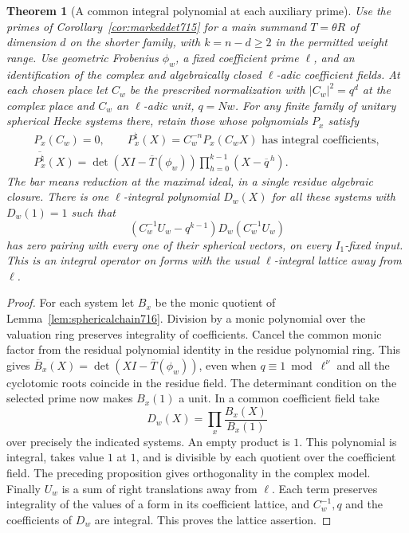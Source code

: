 \documentclass[a4paper,11pt]{article}
\newtheorem{theorem}[proposition]{Theorem}
\theoremstyle{definition}
\theoremstyle{remark}
\numberwithin{equation}{section}
\begin{document}
\begin{theorem}[A common integral polynomial at each auxiliary prime]
\leavevmode\label{thm:commonhecke716}
Use the primes of Corollary~\ref{cor:markeddet715} for a main
summand \(T=\theta R\) of dimension \(d\) on the shorter
family, with \(k=n-d\ge2\) in the permitted weight range.
Use geometric Frobenius \(\phi_w\), a fixed coefficient prime
\(\ell\), and an identification of the complex and algebraically
closed \(\ell\)-adic coefficient fields. At each chosen place
let \(C_w\) be the prescribed normalization with
\(|C_w|^2=q^d\) at the complex place and \(C_w\) an
\(\ell\)-adic unit, \(q=Nw\). For any finite family of unitary spherical Hecke systems
there, retain those whose polynomials \(P_x\) satisfy
\[
 \begin{gathered}
 P_x(C_w)=0,\qquad P_x^\natural(X)=C_w^{-n}P_x(C_wX)
                       \text{ has integral coefficients},\\
 \overline{P_x^\natural}(X)=
       \det(XI-\overline{T}(\phi_w))
                     \prod_{h=0}^{k-1}(X-\overline q^{\,h}).
 \end{gathered}
\]
The bar means reduction at the maximal ideal, in a single
residue algebraic closure. There is one \(\ell\)-integral
polynomial \(D_w(X)\) for all these systems with \(D_w(1)=1\)
such that
\[
       (C_w^{-1}U_w-q^{k-1})D_w(C_w^{-1}U_w)
\]
has zero pairing with every one of their spherical vectors,
on every \(I_1\)-fixed input. This is an integral operator
on forms with the usual \(\ell\)-integral lattice away from
\(\ell\).
\end{theorem}
\begin{proof}
For each system let \(B_x\) be the monic quotient of
Lemma~\ref{lem:sphericalchain716}. Division by a monic
polynomial over the valuation ring preserves integrality
of coefficients. Cancel the common monic factor from the
residual polynomial identity in the residue polynomial ring.
This gives
\(\overline B_x(X)=\det(XI-\overline T(\phi_w))\), even when
\(q\equiv1\bmod\ell^\nu\) and all the cyclotomic roots coincide
in the residue field. The determinant condition on the selected
prime now makes \(B_x(1)\) a unit. In a common coefficient
field take
\[
                 D_w(X)=\prod_x\frac{B_x(X)}{B_x(1)}
\]
over precisely the indicated systems. An empty product is
\(1\). This polynomial is integral, takes value \(1\) at \(1\),
and is divisible by each quotient over the coefficient field.
The preceding proposition gives orthogonality in the complex
model. Finally \(U_w\) is a sum of right translations away
from \(\ell\). Each term preserves integrality of the values
of a form in its coefficient lattice, and \(C_w^{-1},q\)
and the coefficients of \(D_w\) are integral. This proves the
lattice assertion.
\end{proof}
\end{document}
